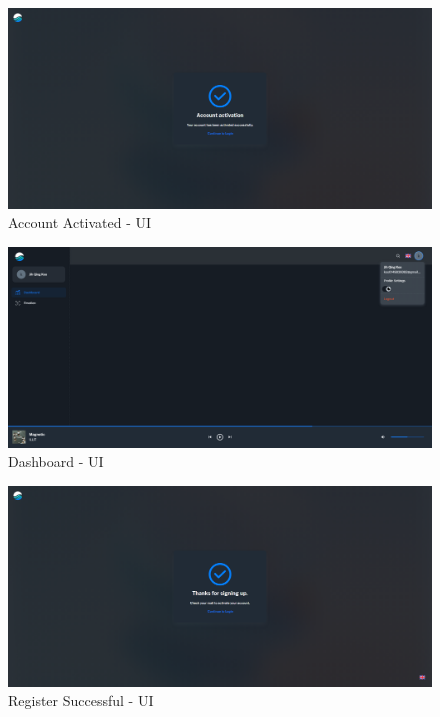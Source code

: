 \setcounter{figure}{0}
\setcounter{table}{0} 
\begin{figure}[H]
    \centering
    \includegraphics[width=14cm]{Images/acc-activated.png}
    \caption{Account Activated - UI}
    \label{fig:acc-activated}
\end{figure}
\begin{figure}[H]
    \centering
    \includegraphics[width=14cm]{Images/dashboard.png}
    \caption{Dashboard - UI}
    \label{fig:dashboard-ui}
\end{figure}
\begin{figure}[H]
    \centering
    \includegraphics[width=14cm]{Images/register-successfull-ui.png}
    \caption{Register Successful - UI}
    \label{fig:register-succesfull}
\end{figure}
